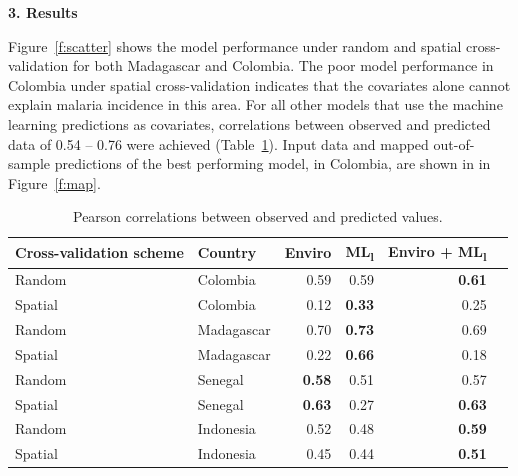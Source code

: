 \documentclass[11pt]{article}
\begin{document}
{\bf 3. Results}

Figure~\ref{f:scatter} shows the model performance under random and spatial cross-validation for both Madagascar and Colombia. 
The poor model performance in Colombia under spatial cross-validation indicates that the covariates alone cannot explain malaria incidence in this area. 
For all other models that use the machine learning predictions as covariates, correlations between observed and predicted data of 0.54 -- 0.76 were achieved (Table~\ref{t:results}).
Input data and mapped out-of-sample predictions of the best performing model, in Colombia, are shown in in Figure~\ref{f:map}.




\begin{table}[h!]
\caption{Pearson correlations between observed and predicted values. }
\centering
\begin{tabular}{llrrrr}
Cross-validation scheme & Country &  Enviro &  ML\textsubscript{l} &  Enviro + ML\textsubscript{l} \\
\hline 
 Random &  Colombia & 0.59 & 0.59 & \textbf{0.61} \\
 Spatial &  Colombia &  0.12 &  \textbf{0.33} &  0.25\\
 Random &  Madagascar &  0.70 &  \textbf{0.73} & 0.69 \\
 Spatial &  Madagascar &  0.22 &  \textbf{0.66} & 0.18\\
 Random &  Senegal &  \textbf{0.58} &  0.51 & 0.57 \\
 Spatial &  Senegal &  \textbf{0.63} &  0.27 &  \textbf{0.63} \\
 Random &  Indonesia &  0.52 &  0.48 &  \textbf{0.59} \\
 Spatial &  Indonesia &  0.45 &  0.44 &  \textbf{0.51} \\
\end{tabular}
\label{t:results}
\end{table}
\end{document}
